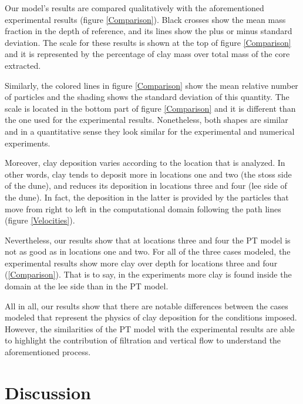 \documentclass[draft,linenumbers]{agujournal2018}
\begin{document}
Our model's results are compared qualitatively with the aforementioned experimental results (figure \ref{Comparison}). Black crosses show the mean mass fraction in the depth of reference, and its lines show the plus or minus standard deviation. The scale for these results is shown at the top of figure \ref{Comparison} and it is represented by the percentage of clay mass over total mass of the core extracted. 

Similarly, the colored lines in figure \ref{Comparison} show the mean relative number of particles and the shading shows the standard deviation of this quantity. The scale is located in the bottom part of figure \ref{Comparison} and it is different than the one used for the experimental results. Nonetheless, both shapes are similar and in a quantitative sense they look similar for the experimental and numerical experiments.

Moreover, clay deposition varies according to the location that is analyzed. In other words, clay tends to deposit more in locations one and two (the stoss side of the dune), and reduces its deposition in locations three and four (lee side of the dune). In fact, the deposition in the latter is provided by the particles that move from right to left in the computational domain following the path lines (figure \ref{Velocities}).

Nevertheless, our results show that at locations three and four the PT model is not as good as in locations one and two. For all of the three cases modeled, the experimental results show more clay over depth for locations three and four (\ref{Comparison}). That is to say, in the experiments more clay is found inside the domain at the lee side than in the PT model. 

All in all, our results show that there are notable differences between the cases modeled that represent the physics of clay deposition for the conditions imposed. However, the similarities of the PT model with the experimental results are able to highlight the contribution of filtration and vertical flow to understand the aforementioned process. 

\section{Discussion} \label{Discussion}
\end{document}

